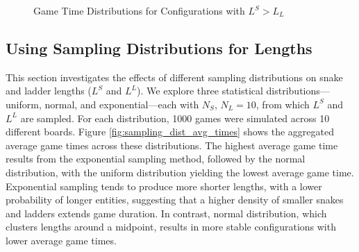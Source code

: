 \documentclass[12pt]{report}
\begin{document}
	\begin{figure}[ht]
		\centering
		\linebreak
		\caption{Game Time Distributions for Configurations with $L^S > L_L$}
		\label{fig:fixed_lengths_dist}
	\end{figure}
	
	
	\subsection{Using Sampling Distributions for Lengths}
	
	This section investigates the effects of different sampling distributions on snake and ladder lengths ($L^S$ and $L^L$). We explore three statistical distributions—uniform, normal, and exponential—each with $N_S$, $N_L = 10$, from which $L^S$ and $L^L$ are sampled. For each distribution, 1000 games were simulated across 10 different boards. Figure \ref{fig:sampling_dist_avg_times} shows the aggregated average game times across these distributions. The highest average game time results from the exponential sampling method, followed by the normal distribution, with the uniform distribution yielding the lowest average game time. Exponential sampling tends to produce more shorter lengths, with a lower probability of longer entities, suggesting that a higher density of smaller snakes and ladders extends game duration. In contrast, normal distribution, which clusters lengths around a midpoint, results in more stable configurations with lower average game times.
	
\end{document}
